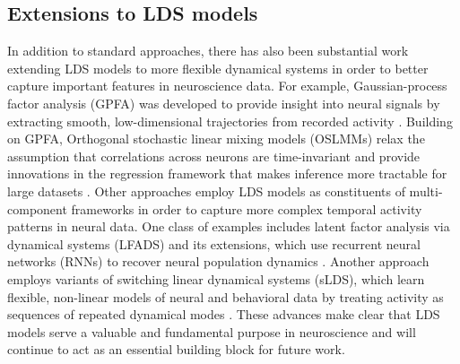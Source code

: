 \subsection{Extensions to LDS models}
\label{sec:bestlds:background:extensions}

In addition to standard approaches, there has also been substantial work extending LDS models to more flexible dynamical systems in order to better capture important features in neuroscience data. For example, Gaussian-process factor analysis (GPFA) was developed to provide insight into neural signals by extracting smooth, low-dimensional trajectories from recorded activity \cite{yu_gaussian-process_2009}. Building on GPFA, Orthogonal stochastic linear mixing models (OSLMMs) relax the assumption that correlations across neurons are time-invariant and provide innovations in the regression framework that makes inference more tractable for large datasets \cite{meng_bayesian_2022}. Other approaches employ LDS models as constituents of multi-component frameworks in order to capture more complex temporal activity patterns in neural data. One class of examples includes latent factor analysis via dynamical systems (LFADS) and its extensions, which use recurrent neural networks (RNNs) to recover neural population dynamics \cite{pandarinath_inferring_2018, prince_parallel_2021, zhu_deep_2022}. Another approach employs variants of switching linear dynamical systems (sLDS), which learn flexible, non-linear models of neural and behavioral data by treating activity as sequences of repeated dynamical modes \cite{linderman_hierarchical_2019, nassar_tree-structured_2019, zoltowski_general_2020, mudrik_decomposed_2022, wang_bayesian_2022, weinreb_keypoint-moseq_2023}. These advances make clear that LDS models serve a valuable and fundamental purpose in neuroscience and will continue to act as an essential building block for future work. 